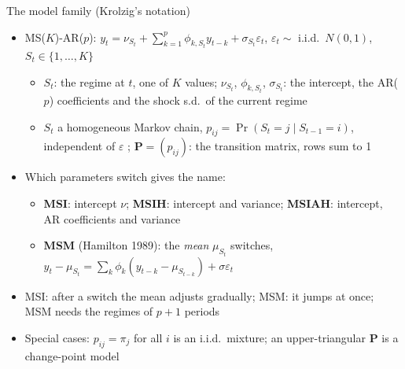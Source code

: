 \begin{frame}{The model family (Krolzig's notation)}
\itemsize{\small}
\begin{itemize}
    \item MS($K$)-AR($p$): $y_t = \nu_{S_t} + \sum_{k=1}^p \phi_{k,S_t} y_{t-k} + \sigma_{S_t}\varepsilon_t$, $\varepsilon_t \sim$ i.i.d.\ $N(0, 1)$, $S_t \in \{1, \dots, K\}$
    \begin{itemize}
        \item $S_t$: the regime at $t$, one of $K$ values; $\nu_{S_t}$, $\phi_{k,S_t}$, $\sigma_{S_t}$: the intercept, the AR($p$) coefficients and the shock s.d.\ of the current regime
        \item $S_t$ a homogeneous Markov chain, $p_{ij} = \Pr(S_t = j \mid S_{t-1} = i)$, independent of $\varepsilon$ ; $\mathbf{P} = (p_{ij})$: the transition matrix, rows sum to 1
    \end{itemize}
    \item Which parameters switch gives the name:
    \begin{itemize}
        \item \textbf{MSI}: intercept $\nu$; \textbf{MSIH}: intercept and variance; \textbf{MSIAH}: intercept, AR coefficients and variance
        \item \textbf{MSM} (Hamilton 1989): the \emph{mean} $\mu_{S_t}$ switches, $y_t - \mu_{S_t} = \sum_k \phi_k(y_{t-k} - \mu_{S_{t-k}}) + \sigma\varepsilon_t$
    \end{itemize}
    \item MSI: after a switch the mean adjusts gradually; MSM: it jumps at once; MSM needs the regimes of $p + 1$ periods
    \item Special cases: $p_{ij} = \pi_j$ for all $i$ is an i.i.d.\ mixture; an upper-triangular $\mathbf{P}$ is a change-point model 
\end{itemize}
\end{frame}

